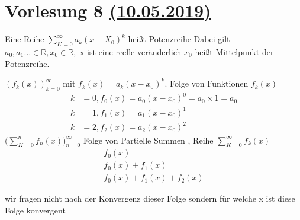 \section{Vorlesung 8 \href{https://tu-dresden.de/mn/math/algebra/das-institut/beschaeftigte/antje-noack/ressourcen/dateien/v120-1/MathMethInf08.pdf?lang=en}{(10.05.2019)}}
\begin{definition}[Potenzreihen]
Eine Reihe $\sum_{K=0}^{\infty}{a_k (x - X_0)^k} $ heißt Potenzreihe Dabei gilt $a_0,a_1 \dots \in \mathbb{R} , x_0 \in \mathbb{R} ,$ x ist eine reelle veränderlich $x_0$ heißt Mittelpunkt der Potenzreihe.    
\end{definition}

\begin{remark}
$(f_k(x))_{k=0}^{\infty}$ mit $f_k(x) = a_k(x-x_0)^k$. Folge von Funktionen $f_k(x)$
\begin{align*}
k &= 0 ,f_0(x) = a_0(x-x_0)^0 = a_0 \times 1 = a_0\\
k &= 1 ,f_1(x) = a_1(x-x_0)^1\\
k &= 2 ,f_2(x) = a_2(x-x_0)^2
\end{align*}
$ \big( \sum_{K=0}^{n}{f_n(x)} \big)_{n=0}^{\infty} $ Folge von Partielle Summen , Reihe $\sum_{K=0}^{\infty}{f_k(x)}$
\begin{gather*}
f_0(x)\\
f_0(x) + f_1(x)\\
f_0(x) + f_1(x) + f_2(x)
\end{gather*}
\end{remark}

\begin{remark}
wir fragen nicht nach der Konvergenz dieser Folge sondern für welche x ist diese Folge konvergent 
\end{remark}

